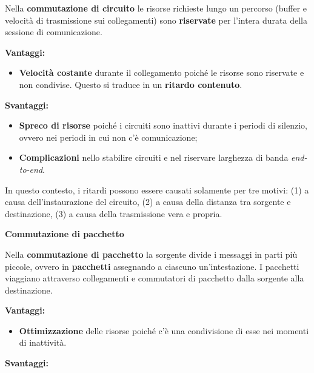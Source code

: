 \documentclass[a4paper]{article}
\begin{document}
	Nella \textbf{commutazione di circuito} le risorse richieste lungo un percorso (buffer e velocità di trasmissione sui collegamenti) sono \textbf{riservate} per l'intera durata della sessione di comunicazione.
	
	\noindent
	\textcolor{Green4}{\textbf{Vantaggi:}}
	
	\begin{itemize}
		\item[\ding{51}] \textbf{Velocità costante} durante il collegamento poiché le risorse sono riservate e non condivise. Questo si traduce in un \textbf{ritardo contenuto}.
	\end{itemize}

	\noindent
	\textcolor{Red1}{\textbf{Svantaggi:}}
	
	\begin{itemize}
			\item[\ding{55}] \textbf{Spreco di risorse} poiché i circuiti sono inattivi durante i periodi di silenzio, ovvero nei periodi in cui non c’è comunicazione;
			
			\item[\ding{55}] \textbf{Complicazioni} nello stabilire circuiti e nel riservare larghezza di banda \emph{end-to-end}.
	\end{itemize}

	In questo contesto, i ritardi possono essere causati solamente per tre motivi: (1) a causa dell'instaurazione del circuito, (2) a causa della distanza tra sorgente e destinazione, (3) a causa della trasmissione vera e propria.
	
	\begin{center}
		\large \textcolor{Red3}{\textbf{Commutazione di pacchetto}}
	\end{center}

	Nella \textbf{commutazione di pacchetto} la sorgente divide i messaggi in parti più piccole, ovvero in \textbf{pacchetti} assegnando a ciascuno un'intestazione. I pacchetti viaggiano attraverso collegamenti e commutatori di pacchetto dalla sorgente alla destinazione.
	
	\noindent
	\textcolor{Green4}{\textbf{Vantaggi:}}
	
	\begin{itemize}
		\item[\ding{51}] \textbf{Ottimizzazione} delle risorse poiché c’è una condivisione di esse nei momenti di inattività.
	\end{itemize}
	
	\noindent
	\textcolor{Red1}{\textbf{Svantaggi:}}
	
\end{document}
